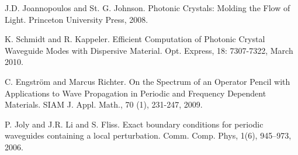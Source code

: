 
\begin{thebibliography}{10}

{\sc J.D. Joannopoulos and St. G. Johnson}. {{Photonic Crystals: Molding the Flow of Light}}. Princeton University Press, 2008.



{\sc K. Schmidt and R. Kappeler}. {{Efficient Computation of Photonic Crystal Waveguide Modes with Dispersive Material}}. Opt. Express, 18: 7307-7322, March 2010.



{\sc C. Engstr\"om and Marcus Richter}. {On the Spectrum of an Operator Pencil with Applications to Wave Propagation in Periodic and Frequency Dependent Materials}. SIAM J. Appl. Math., 70 (1), 231-247, 2009.



{\sc P. Joly and J.R. Li and S. Fliss}. {Exact boundary conditions for periodic waveguides containing a local perturbation}. Comm. Comp. Phys, 1(6), 945--973, 2006.

\end{thebibliography}
